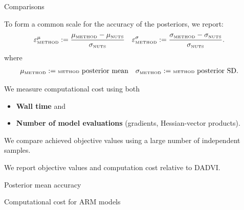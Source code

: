 \documentclass[8pt]{beamer}\usepackage[]{graphicx}\usepackage[]{color}
\begin{document}
\begin{frame}{Comparisons}

To form a common scale for the accuracy of the
posteriors, we report:
%
\begin{align*}
\muerr_{\method} :={}& \frac{\mu_{\method} - \mu_{\nuts}}{\sigma_{\nuts}}
&
\sderr_{\method} :={}& \frac{\sigma_{\method} - \sigma_{\nuts}}{\sigma_{\nuts}}.
%
\end{align*}
%
where
%
\begin{align*}
%
\mu_{\method} :={}& \method \text{ posterior mean}
&
\sigma_{\method} :={}& \method\text{ posterior SD}.
%
\end{align*}
   
\pause
\hrulefill

We measure computational cost using both
%
\begin{itemize}
\item \textbf{Wall time} and 
\item \textbf{Number of model evaluations} (gradients, Hessian-vector products).
\end{itemize}
%

We compare achieved objective values using a large number of independent samples.

We report objective values and computation cost relative to DADVI.


\end{frame}




\begin{frame}{Posterior mean accuracy}
    \PosteriorMeanAccuracy{}
\end{frame}


\begin{frame}{Computational cost for ARM models}
\RuntimeARM{}
\end{frame}

\end{document}
